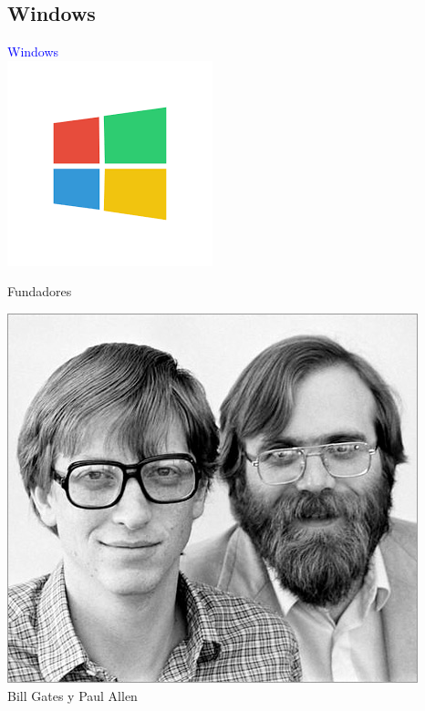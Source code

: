 \documentclass[10pt,xcolor={dvipsnames}]{beamer}
\begin{document}
\subsection{Windows}
\begin{frame}
\begin{center}
\Huge{\textcolor{blue}{Windows}} \\ \vspace{0.5cm}
\includegraphics[scale=0.5]{Figures/windows}
\end{center}
\end{frame}

\begin{frame}{Fundadores}
\begin{center}
\includegraphics[scale=0.45]{Figures/Bill-Gates-y-Paul-Allen} \\
Bill Gates y Paul Allen
\end{center}
\end{frame}
\end{document}
